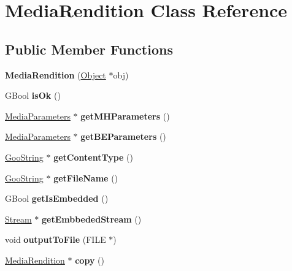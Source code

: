 \hypertarget{class_media_rendition}{}\section{Media\+Rendition Class Reference}
\label{class_media_rendition}
\subsection*{Public Member Functions}
\begin{DoxyCompactItemize}
\item 
\mbox{\label{class_media_rendition_a45883c4ac61016877df46e49ab4c28f5}} 
{\bfseries Media\+Rendition} (\hyperlink{class_object}{Object} $\ast$obj)
\item 
\mbox{\label{class_media_rendition_a3793aa0dd1b7a717bcffb846b464d318}} 
G\+Bool {\bfseries is\+Ok} ()
\item 
\mbox{\label{class_media_rendition_a7bec6124788201adc36e5a4a5d145b0f}} 
\hyperlink{struct_media_parameters}{Media\+Parameters} $\ast$ {\bfseries get\+M\+H\+Parameters} ()
\item 
\mbox{\label{class_media_rendition_ad521770aa4876e829cdf2574fd949625}} 
\hyperlink{struct_media_parameters}{Media\+Parameters} $\ast$ {\bfseries get\+B\+E\+Parameters} ()
\item 
\mbox{\label{class_media_rendition_af2334696a95ff29c86da797a6810b089}} 
\hyperlink{class_goo_string}{Goo\+String} $\ast$ {\bfseries get\+Content\+Type} ()
\item 
\mbox{\label{class_media_rendition_a7f11f544d9156899082e74a414b85a8d}} 
\hyperlink{class_goo_string}{Goo\+String} $\ast$ {\bfseries get\+File\+Name} ()
\item 
\mbox{\label{class_media_rendition_aca4cd2551580517edc206fcc893ac7d9}} 
G\+Bool {\bfseries get\+Is\+Embedded} ()
\item 
\mbox{\label{class_media_rendition_a348330f5b42d0873f6e93d3c4a969d68}} 
\hyperlink{class_stream}{Stream} $\ast$ {\bfseries get\+Embbeded\+Stream} ()
\item 
\mbox{\label{class_media_rendition_a0053fa01c6789cc742776691a945a89f}} 
void {\bfseries output\+To\+File} (F\+I\+LE $\ast$)
\item 
\mbox{\label{class_media_rendition_a90da18fdd56f20a3f017820f191fe6d5}} 
\hyperlink{class_media_rendition}{Media\+Rendition} $\ast$ {\bfseries copy} ()
\end{DoxyCompactItemize}


